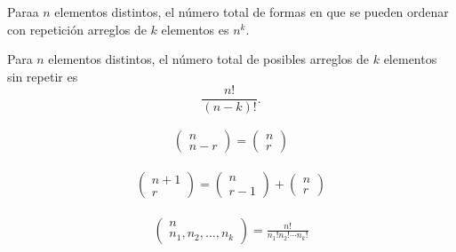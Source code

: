 \begin{Def}
Paraa $n$ elementos distintos, el n\'umero total de formas en que se pueden ordenar con repetici\'on arreglos de $k$ elementos es $n^{k}$.

\end{Def}

\begin{Def}
Para $n$ elementos distintos, el n\'umero total de posibles arreglos de $k$ elementos sin repetir es $$\frac{n!}{\left(n-k\right)!}.$$

\end{Def}


\begin{lem}
\begin{eqnarray}
\left(\begin{array}{c}
n\\
n-r
\end{array}\right)=\left(\begin{array}{c}
n\\
r
\end{array}\right)
\end{eqnarray}

\end{lem}

\begin{Teo}
\begin{eqnarray}
\left(\begin{array}{c}
n+1\\
r
\end{array}\right)=\left(\begin{array}{c}
n\\
r-1
\end{array}\right)+\left(\begin{array}{c}
n\\
r
\end{array}\right)
\end{eqnarray}
\end{Teo}


\begin{lem}
\begin{eqnarray}
\left(\begin{array}{c}
n\\
n_{1},n_{2},\ldots,n_{k}
\end{array}\right)=\frac{n!}{n_{1}!n_{2}!\cdots n_{k}!}
\end{eqnarray}

\end{lem}

